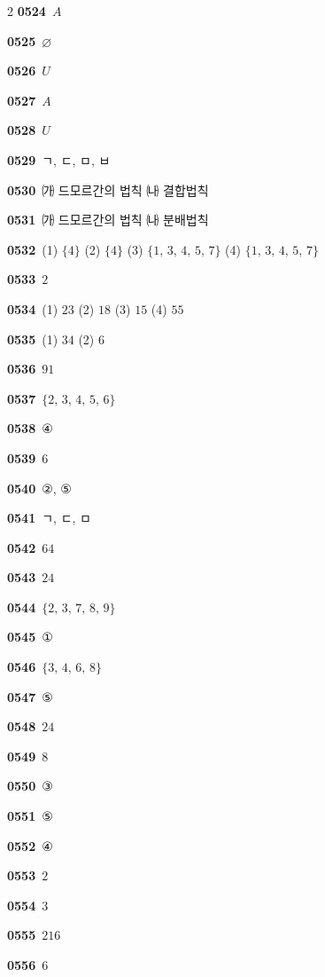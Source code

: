\documentclass[10pt,a4paper]{article}
\begin{document}
\begin{multicols}{2}
\noindent\textbf{0524}\ $A$\par
\noindent\textbf{0525}\ $\varnothing$\par
\noindent\textbf{0526}\ $U$\par
\noindent\textbf{0527}\ $A$\par
\noindent\textbf{0528}\ $U$\par
\noindent\textbf{0529}\ ㄱ, ㄷ, ㅁ, ㅂ\par
\noindent\textbf{0530}\ ㈎ 드모르간의 법칙 \quad ㈏ 결합법칙\par
\noindent\textbf{0531}\ ㈎ 드모르간의 법칙 \quad ㈏ 분배법칙\par
\noindent\textbf{0532}\ (1) $\{4\}$ (2) $\{4\}$ (3) $\{1,\,3,\,4,\,5,\,7\}$ (4) $\{1,\,3,\,4,\,5,\,7\}$\par
\noindent\textbf{0533}\ $2$\par
\noindent\textbf{0534}\ (1) $23$ (2) $18$ (3) $15$ (4) $55$\par
\noindent\textbf{0535}\ (1) $34$ (2) $6$\par
\noindent\textbf{0536}\ $91$\par
\noindent\textbf{0537}\ $\{2,\,3,\,4,\,5,\,6\}$\par
\noindent\textbf{0538}\ ④\par
\noindent\textbf{0539}\ $6$\par
\noindent\textbf{0540}\ ②, ⑤\par
\noindent\textbf{0541}\ ㄱ, ㄷ, ㅁ\par
\noindent\textbf{0542}\ $64$\par
\noindent\textbf{0543}\ $24$\par
\noindent\textbf{0544}\ $\{2,\,3,\,7,\,8,\,9\}$\par
\noindent\textbf{0545}\ ①\par
\noindent\textbf{0546}\ $\{3,\,4,\,6,\,8\}$\par
\noindent\textbf{0547}\ ⑤\par
\noindent\textbf{0548}\ $24$\par
\noindent\textbf{0549}\ $8$\par
\noindent\textbf{0550}\ ③\par
\noindent\textbf{0551}\ ⑤\par
\noindent\textbf{0552}\ ④\par
\noindent\textbf{0553}\ $2$\par
\noindent\textbf{0554}\ $3$\par
\noindent\textbf{0555}\ $216$\par
\noindent\textbf{0556}\ $6$\par

\end{multicols}
\end{document}
